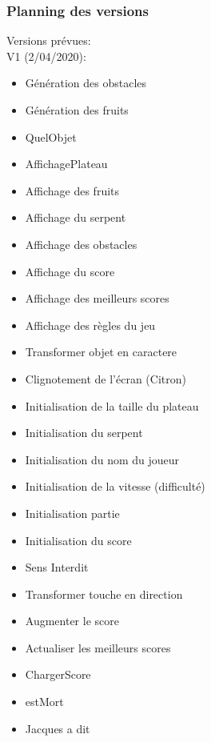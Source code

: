 \documentclass[11pt,a4paper]{article}
\begin{document}
        \subsubsection{Planning des versions}\label{sssect:versions}
            
            Versions prévues: \\
            
            V1 (2/04/2020): 
            \\
            \begin{itemize}
                \item Génération des obstacles 
                \item Génération des fruits
                \item QuelObjet 
                \item AffichagePlateau
                \item Affichage des fruits
                \item Affichage du serpent
                \item Affichage des obstacles 
                \item Affichage du score
                \item Affichage des meilleurs scores
                \item Affichage des règles du jeu
                \item Transformer objet en caractere
                \item Clignotement de l'écran (Citron)
                \item Initialisation de la taille du plateau 
                \item Initialisation du serpent
                \item Initialisation du nom du joueur
                \item Initialisation de la vitesse (difficulté) 
                \item Initialisation partie
                \item Initialisation du score
                \item Sens Interdit
                \item Transformer touche en direction
                \item Augmenter le score
                \item Actualiser les meilleurs scores
                \item ChargerScore
                \item estMort
                \item Jacques a dit\\
               
            \end{itemize}
            
\end{document}
